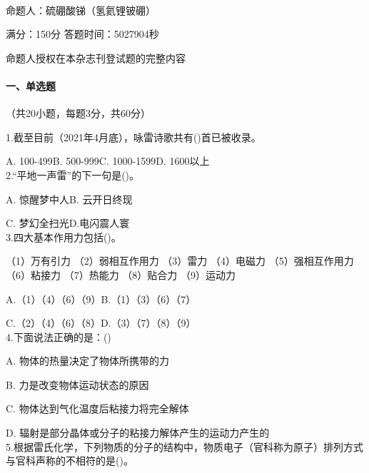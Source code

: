 \documentclass[UTF8,12pt,oneside]{ctexbook}
\begin{document}
    \clearpage
    \normalsize
        
    \begin{center}
    \Large
    \songti
    \normalsize
    
    ~\\
    命题人：硫硼酸锑（氢氦锂铍硼）
    
    满分：150分 \qquad 答题时间：5027904秒
    
    命题人授权在本杂志刊登试题的完整内容
    
    \end{center}
    
    \paragraph{一、单选题}（共20小题，每题3分，共60分）
    
    1.截至目前（2021年4月底），咏雷诗歌共有(\qquad)首已被收录。
    
    A. 100-499\qquad B. 500-999\qquad C. 1000-1599\qquad D. 1600以上
    ~\\
    
    2.“平地一声雷”的下一句是(\qquad)。
    
    A. 惊醒梦中人\qquad \qquad B. 云开日终现
    
    C. 梦幻全扫光\qquad \qquad D.电闪震人寰
    ~\\
     
    3.四大基本作用力包括(\qquad)。
    
    （1）万有引力 （2）弱相互作用力 （3）雷力 （4）电磁力 （5）强相互作用力 （6）粘接力 （7）热能力 （8）贴合力 （9）运动力

    A.（1）（4）（6）（9）\qquad B.（1）（3）（6）（7） 
    
    C.（2）（4）（6）（8）\qquad D.（3）（7）（8）（9） 
    ~\\
    
    4.下面说法正确的是：(\qquad)
    
    A. 物体的热量决定了物体所携带的力
    
    B. 力是改变物体运动状态的原因
    
    C. 物体达到气化温度后粘接力将完全解体
    
    D. 辐射是部分晶体或分子的粘接力解体产生的运动力产生的
    ~\\
    
    5.根据雷氏化学，下列物质的分子的结构中，物质电子（官科称为原子）排列方式与官科声称的不相符的是(\qquad)。
    
\end{document}
